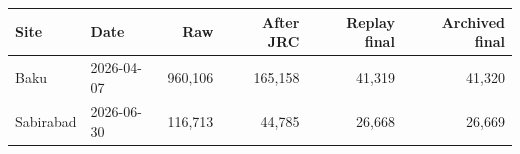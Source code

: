 \begin{tabular}{@{}llrrrr@{}}
\toprule
Site & Date & Raw & After JRC & Replay final & Archived final \\
\midrule
Baku & 2026-04-07 & 960,106 & 165,158 & 41,319 & 41,320 \\
Sabirabad & 2026-06-30 & 116,713 & 44,785 & 26,668 & 26,669 \\
\bottomrule
\end{tabular}
